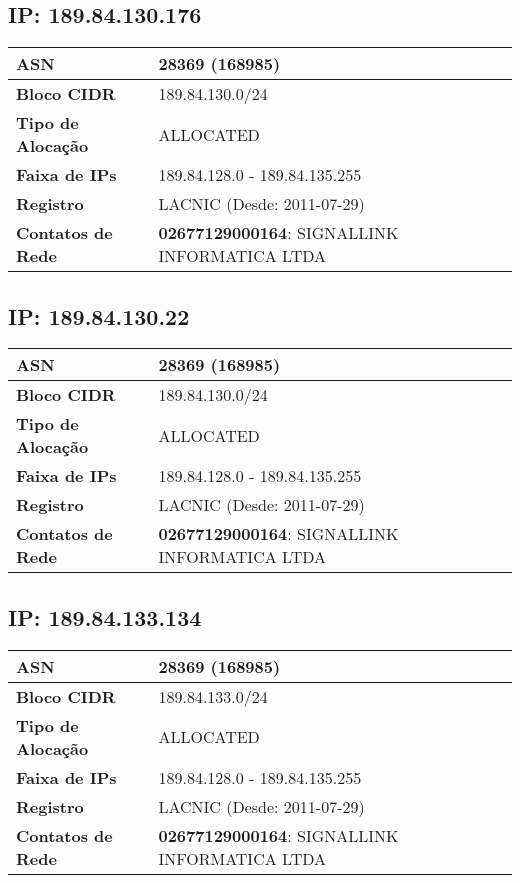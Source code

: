    \subsection{IP: 189.84.130.176}
    \begin{tabular}{|l|l|}
    \hline
    \textbf{ASN} & 28369 (168985) \\ \hline
    \textbf{Bloco CIDR} & 189.84.130.0/24 \\ \hline
    \textbf{Tipo de Alocação} & ALLOCATED \\ \hline
    \textbf{Faixa de IPs} & 189.84.128.0 - 189.84.135.255 \\ \hline
    \textbf{Registro} & LACNIC (Desde: 2011-07-29) \\ \hline
        
\textbf{Contatos de Rede} & \textbf{02677129000164}: SIGNALLINK INFORMATICA LTDA 
\\ \hline
\end{tabular}


    \subsection{IP: 189.84.130.22}
    \begin{tabular}{|l|l|}
    \hline
    \textbf{ASN} & 28369 (168985) \\ \hline
    \textbf{Bloco CIDR} & 189.84.130.0/24 \\ \hline
    \textbf{Tipo de Alocação} & ALLOCATED \\ \hline
    \textbf{Faixa de IPs} & 189.84.128.0 - 189.84.135.255 \\ \hline
    \textbf{Registro} & LACNIC (Desde: 2011-07-29) \\ \hline
        
\textbf{Contatos de Rede} & \textbf{02677129000164}: SIGNALLINK INFORMATICA LTDA 
\\ \hline
\end{tabular}


    \subsection{IP: 189.84.133.134}
    \begin{tabular}{|l|l|}
    \hline
    \textbf{ASN} & 28369 (168985) \\ \hline
    \textbf{Bloco CIDR} & 189.84.133.0/24 \\ \hline
    \textbf{Tipo de Alocação} & ALLOCATED \\ \hline
    \textbf{Faixa de IPs} & 189.84.128.0 - 189.84.135.255 \\ \hline
    \textbf{Registro} & LACNIC (Desde: 2011-07-29) \\ \hline
        
\textbf{Contatos de Rede} & \textbf{02677129000164}: SIGNALLINK INFORMATICA LTDA 
\\ \hline
\end{tabular}



